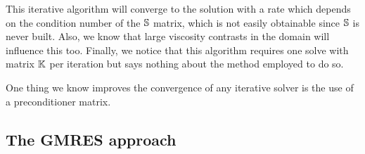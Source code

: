 This iterative algorithm will converge to the solution with a rate which depends on 
the condition number of the ${\mathbb{S}}$ matrix, which is not easily obtainable since 
${\mathbb{S}}$ is never built. Also, we know that large viscosity contrasts in the domain 
will influence this too. Finally, we notice that this algorithm requires one solve
with matrix ${\mathbb{K}}$ per iteration but says nothing about the method employed to do so.

One thing we know improves the convergence of any iterative solver is the use of a 
preconditioner matrix.  














\subsection{The GMRES approach}
